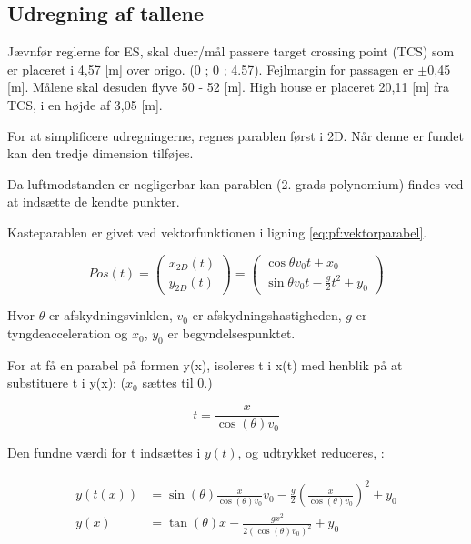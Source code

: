 \subsection{Udregning af tallene}
\label{sec:udregning_af_parabel}


Jævnfør reglerne for ES, skal duer/mål passere target crossing point (TCS) som er 
placeret i 4,57 [m] over origo. (0 ; 0 ; 4.57). Fejlmargin for passagen er \(\pm\)0,45 [m]. 
Målene skal desuden flyve 50 - 52 [m].  High house er placeret 20,11 [m] fra TCS, i en 
højde af 3,05 [m]. 

For at simplificere udregningerne, regnes parablen først i 2D. Når denne er fundet kan den tredje dimension tilføjes.  

Da luftmodstanden er negligerbar kan parablen (2. grads polynomium) findes ved at indsætte de kendte punkter. 

Kasteparablen er givet ved vektorfunktionen i ligning  \ref{eq:pf:vektorparabel}.

\begin{equation}
	Pos(t) = \left( \begin{array}{c}
	x_{2D}(t) \\
	y_{2D}(t)
	\end{array}
	\right)
	= \left( \begin{array}{c}
	\cos \theta v_0 t + x_0 \\
	\sin \theta v_0 t - \frac{g}{2} t^2 + y_0
	\end{array}
	\right)
\label{eq:pf:vektorparabel}
\end{equation}

Hvor \(\theta\) er afskydningsvinklen, \(v_0\) er afskydningshastigheden, \(g\) er tyngdeacceleration og \(x_0\), \(y_0\) er begyndelsespunktet. 

For at få en parabel på formen y(x), isoleres t i x(t) med henblik på at substituere t i y(x): (\(x_0\) sættes til 0.)

\begin{equation}
t = \frac{x}{\cos \left( \theta \right) v_0}
\label{eq:pf:x(t)}
\end{equation}

Den fundne værdi for t indsættes i \(y(t)\), og udtrykket reduceres, \citep[Side. 67]{fund_of_physics}: 

\begin{align}
\begin{split}
y(t(x)) &= \sin \left( \theta \right) \frac{x}{\cos \left( \theta \right) v_0} v_0 - \frac{g}{2} \left(\frac{x}{\cos \left( \theta \right) v_0}\right)^2 + y_0 \\
y(x) &= \tan \left( \theta \right) x - \frac{gx^2}{2(\cos \left( \theta \right) v_0)^2} + y_0
\label{eq:pf:y(x(t))}
\end{split}
\end{align}

